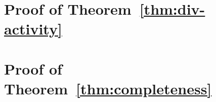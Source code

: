 
\appendix

\section{Proof of Theorem~\ref{thm:div-activity}}\label{ap:div-activity}



\section{Proof of Theorem~\ref{thm:completeness}}\label{ap:completeness}

